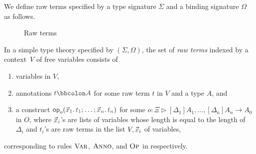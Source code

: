 We define raw terms specified by a type signature $\Sigma$ and a binding signature $\Omega$ as follows.
\begin{definition}
\begin{figure}
  \centering
  \small
  \caption{Raw terms}
  \label{fig:raw-terms}
\end{figure}
  In a simple type theory specified by $(\Sigma, \Omega)$, the set of \emph{raw terms} indexed by a context~$V$ of free variables consists of
  \begin{enumerate}
    \item variables in $V$,
    \item annotations $\isTerm{t \annotate A}$ for some raw term $t$ in $V$ and a type $A$, and
    \item a construct $\tmOpts$ for some $o \colon \Xi \rhd [\Delta_1]A_{1}, \ldots, [\Delta_{n}] A_{n} \to A_0$ in $O$, where $\vars{x}_{\isTerm{i}}$'s are lists of variables whose length is equal to the length of~$\Delta_i$ and $t_i$'s are raw terms in the list $V, \vars{x}_i$ of variables,
  \end{enumerate}
  corresponding to rules $\textnormal{\textsc{Var}}$, $\textnormal{\textsc{Anno}}$, and $\textnormal{\textsc{Op}}$ in  respectively.
\end{definition}


